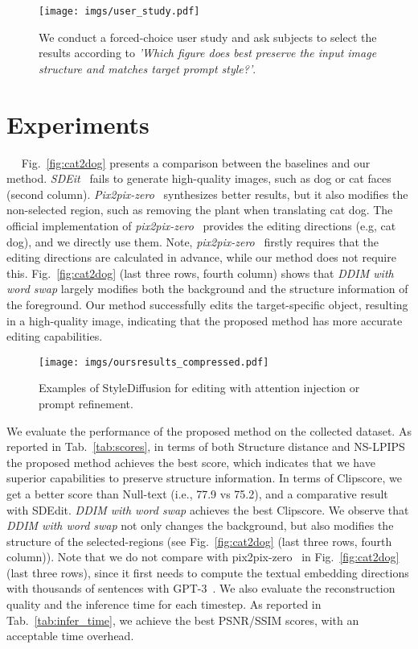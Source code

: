 \documentclass[twocolumn]{svjour3}          \smartqed  \usepackage{graphicx}
\newcommand{\minisection}[1]{\vspace{0.04in} \noindent {\bf #1}\ \ }
\begin{document}
\begin{figure}[t]
\centering
\texttt{[image: imgs/user\_study.pdf]}
        \caption{ We conduct a forced-choice user study and ask subjects to select the results according to \textit{'Which figure does best preserve the input image structure and matches target prompt style?'}.}
    \label{fig:user_study}
\end{figure}

\section{Experiments}

\minisection{Qualitative and quantitative results.}
Fig.~\ref{fig:cat2dog}  presents a comparison between the baselines and our method. \textit{SDEit}~\citep{meng2021sdedit} fails to generate high-quality images, such as dog or cat faces (second column).  
\emph{Pix2pix-zero}~\citep{parmar2023zero} synthesizes better results, but it also modifies the non-selected region, such as removing the plant when translating cat  dog.   The official implementation of \emph{pix2pix-zero}~\citep{parmar2023zero} provides the editing directions (e.g, cat  dog), and we directly use them. Note, \emph{pix2pix-zero}~\citep{parmar2023zero} firstly requires that the editing directions are calculated in advance, while our method does not require this.   Fig.~\ref{fig:cat2dog} (last three rows, fourth column) shows that \textit{DDIM with word swap} largely modifies both the background and the structure information of the foreground.  Our method successfully edits the target-specific object, resulting in a high-quality image, indicating that the proposed method has more accurate editing capabilities.


\begin{figure*}[t]
    \centering

\texttt{[image: imgs/oursresults\_compressed.pdf]} 
\caption{Examples of StyleDiffusion for editing with   attention injection or prompt refinement.}
\label{fig:oursresults}
\end{figure*}

We evaluate the performance of the proposed method on the collected dataset.  As reported in Tab.~\ref{tab:scores},  in terms of both Structure distance and NS-LPIPS the proposed method achieves the best score, which indicates that we have superior capabilities to preserve structure information. In terms of Clipscore,  we get a better score than Null-text (i.e., 77.9 vs 75.2), and a comparative result with SDEdit. \textit{DDIM with word swap} achieves the best Clipscore. We observe that \textit{DDIM with word swap} not only changes the background, but also modifies the structure of the selected-regions (see Fig.~\ref{fig:cat2dog} (last three rows, fourth column)). Note that we do not compare with pix2pix-zero~\citep{parmar2023zero} in Fig.~\ref{fig:cat2dog} (last three rows), since it first needs to compute the textual embedding directions with thousands of sentences with GPT-3~\citep{brown2020language}. We also evaluate the reconstruction quality and the inference time for each timestep. As reported in  Tab.~\ref{tab:infer_time}, we achieve the best PSNR/SSIM scores, with an acceptable time overhead.
  
\end{document}
